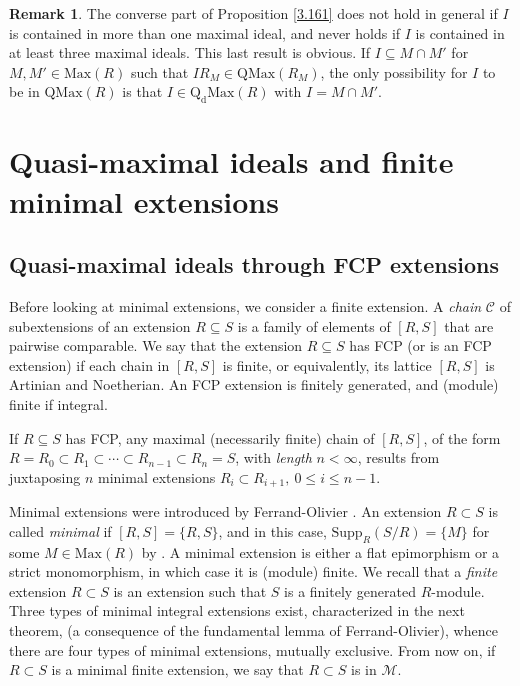 \documentclass[12pt,leqno]{amsart}
\theoremstyle{definition}
\newtheorem{remark}[theorem]{Remark}
\begin{document}
\begin{remark} \label{3.18} The converse part of Proposition \ref{3.161} does not hold in general if $I$ is contained in more than one maximal ideal, and never holds if $I$ is contained in at least three maximal ideals. This last result is obvious. If $I\subseteq M\cap M'$ for $M,M'\in\mathrm{Max}(R)$ such that $IR_M\in\mathrm{QMax}(R_M)$, the only possibility for $I$ to be in $\mathrm{QMax}(R)$ is that $I\in\mathrm{Q_dMax}(R)$ with $I=M\cap M'$. 
\end{remark} 

\section{Quasi-maximal ideals and  finite minimal  extensions} 

\subsection{Quasi-maximal ideals through FCP  extensions}

Before looking at minimal extensions, we consider a finite extension. A {\it chain} $\mathcal C$ of subextensions of an extension $R\subseteq S$ is a family of elements of $[R,S]$ that are pairwise comparable. We say that the extension $R\subseteq S$ has FCP (or is an FCP extension) if each chain in $[R,S]$ is finite, or equivalently, its lattice $[R,S]$ is Artinian and Noetherian. An FCP extension is finitely generated, and (module) finite if integral.  
 
If $R\subseteq S$ has FCP, any maximal (necessarily finite) chain of $[R, S]$, of the form $R=R_0\subset R_1\subset\cdots\subset R_{n-1}\subset R _n=S$, with {\it length} $n<\infty$, results from juxtaposing $n$ minimal extensions $R_i\subset R_{i+1},\ 0\leq i\leq n-1$. 
 
Minimal extensions were introduced by Ferrand-Olivier \cite{FO}. An extension $R\subset S$ is called {\it minimal} if $[R,S]=\{R,S\}$, and in this case, $\mathrm{Supp}_R(S/R)=\{M\}$ for some $M\in\mathrm{Max}(R)$ by \cite[Th\'eor\`eme 2.2]{FO}. A minimal extension is either a flat epimorphism or a strict monomorphism, in which case it is (module) finite. We recall that a {\it finite} extension $R\subset S$ is an extension such that $S$ is a finitely generated $R$-module. Three types of minimal integral extensions exist, characterized in the next theorem, (a consequence of the fundamental lemma of Ferrand-Olivier), whence there are four types of minimal extensions, mutually exclusive. From now on, if $R\subset S$ is a minimal  finite extension, we say that $R\subset S$ is in $\mathcal M$.
\end{document}
